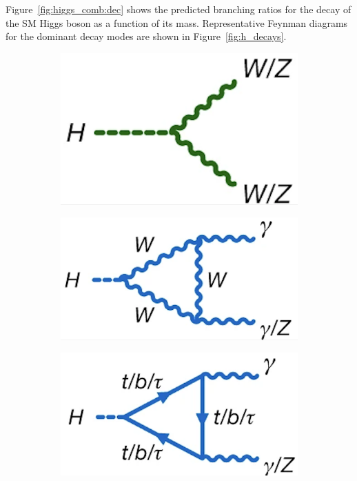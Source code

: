 Figure~\ref{fig:higgs_comb:dec} shows the predicted branching ratios for the decay of the SM Higgs boson as a function of its mass. Representative Feynman diagrams for the dominant decay modes are shown in Figure~\ref{fig:h_decays}.
\begin{figure}[htbp]
    \centering
    
    \begin{subfigure}[b]{0.3\linewidth}
        \centering
        \includegraphics[width=\linewidth]{images/HVV.png}
        \caption{}
        \label{fig:h_decays:VV}
    \end{subfigure}
    \hfill
    \begin{subfigure}[b]{0.3\linewidth}
        \centering
        \includegraphics[width=\linewidth]{images/Hgg.png}
        \caption{}
        \label{fig:h_decays:gg}
    \end{subfigure}
    \hfill
    \begin{subfigure}[b]{0.3\linewidth}
        \centering
        \includegraphics[width=\linewidth]{images/Hgg_loop.png}

\end{subfigure}
\end{figure}
